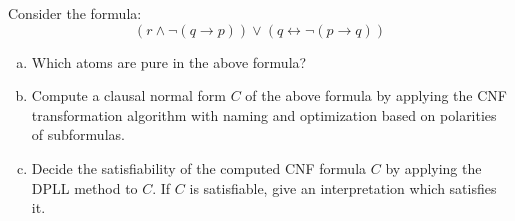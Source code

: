 \begin{mdframed}
    \begin{example}\label{ex:sat}
        Consider the formula:
        \[
            ( r \land \lnot ( q \rightarrow p ) ) \lor ( q \leftrightarrow \lnot ( p \rightarrow q ) )
        \]
        \begin{enumerate}[(a)]
            \item
                Which atoms are pure in the above formula?
            \item\label{subtask:sat-cnf}
                Compute a clausal normal form $C$ of the above formula by
                applying the CNF transformation algorithm with naming and
                optimization based on polarities of subformulas.
            \item
                Decide the satisfiability of the computed CNF formula $C$
                by applying the DPLL method to $C$. If $C$ is
                satisfiable, give an interpretation which
                satisfies it.
        \end{enumerate}
    \end{example}
\end{mdframed}

